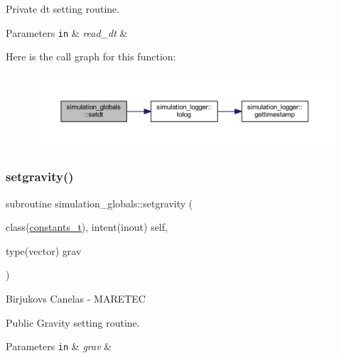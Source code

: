 Private dt setting routine. 
\begin{DoxyParams}[1]{Parameters}
\mbox{\tt in}  & {\em read\+\_\+dt} & \\
\hline
\end{DoxyParams}
Here is the call graph for this function\+:\nopagebreak
\begin{figure}[H]
\begin{center}
\leavevmode
\includegraphics[width=350pt]{namespacesimulation__globals_a3ef0462db5a60ac79304cabd2fdd914d_cgraph}
\end{center}
\end{figure}
\mbox{\label{namespacesimulation__globals_ac655f60155581a71b312f3c1a8c87db2}} 
\subsubsection{\texorpdfstring{setgravity()}{setgravity()}}
{\footnotesize\ttfamily subroutine simulation\+\_\+globals\+::setgravity (\begin{DoxyParamCaption}\item[{class(\hyperlink{structsimulation__globals_1_1constants__t}{constants\+\_\+t}), intent(inout)}]{self,  }\item[{type(vector)}]{grav }\end{DoxyParamCaption})\hspace{0.3cm}{\ttfamily [private]}}



Birjukovs Canelas -\/ M\+A\+R\+E\+T\+EC 

Public Gravity setting routine. 
\begin{DoxyParams}[1]{Parameters}
\mbox{\tt in}  & {\em grav} & \\
\hline
\end{DoxyParams}
\mbox{\label{namespacesimulation__globals_aed3f671899558008ae9f0f009f581baf}} 
